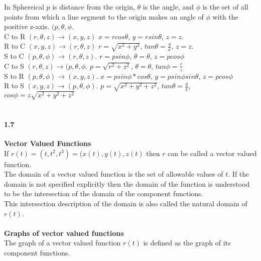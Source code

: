 \documentclass[14pt]{extreport}
\begin{document}
In Sphereical $p$ is distance from the origin, $\theta$ is the angle, and $\phi$ is the set of all points from which a line segment to the origin makes an angle of $\phi$ with the positive z-axis. $(p, \theta, \phi$.\\

C to R $(r, \theta, z) \to (x,y ,z)$ $x = r cos\theta$, $y = r sin\theta$, $z=z$.\\

R to C $(x, y, z) \to (r, \theta, z)$ $r = \sqrt{x^2 + y^2}$, $tan \theta = \frac{y}{x}$, $z=z$.\\

S to C $(p, \theta, \phi) \to (r, \theta, z)$. $r = p sin\phi$, $\theta = \theta$, $z = p cos \phi$\\

C to S $(r, \theta, z) \to (p, \theta, \phi$. $p = \sqrt{r^2 + z^2}$, $\theta=\theta$, $tan\phi = \frac{r}{z}$\\

S to R $(p, \theta, \phi) \to (x, y, z)$. $x=p sin\phi * cos\theta$, $y=p sin\phi sin\theta$, $z = p cos\phi$\\

R to S $(x, y, z) \to (p, \theta, \phi)$. $p = \sqrt{x^2 + y^2 + z^2}$, $tan\theta = \frac{y}{x}$, $cos\phi = z\sqrt{x^2 + y^2 + z^2}$\\\\

\paragraph{1.7}\textbf{Vector Valued Functions}\\

If $r(t) = (t,t^2,t^3)=(x(t), y(t),z(t)$ then $r$ can be called a vector valued function.\\

The domain of a vector valued function is the set of allowable values of $t$. If the domain is not specified explicitly then the domain of the function is understood to be the intersection of the domain of the component functions.\\ This intersection description of the domain is also called the natural domain of $r(t)$.\\\\

\textbf{Graphs of vector valued functions}\\

The graph of a vector valued function $r(t)$ is defined as the graph of its component functions.\\
\end{document}
